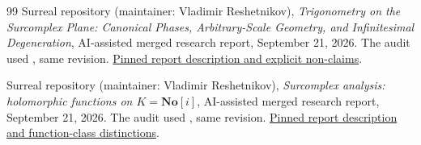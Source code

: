 \documentclass[11pt,letterpaper]{article}
\numberwithin{equation}{section}
\theoremstyle{definition}
\theoremstyle{remark}
\newcommand{\No}{\mathbf{No}}
\begin{document}
\begin{thebibliography}{99}
Surreal repository (maintainer: Vladimir Reshetnikov),
\emph{Trigonometry on the Surcomplex Plane:
Canonical Phases, Arbitrary-Scale Geometry, and Infinitesimal Degeneration},
AI-assisted merged research report, September 21, 2026.
The audit used , same revision.
\href{https://github.com/VladimirReshetnikov/Surreal/blob/e260237db9b71da8b74a0c13c8e6355119091100/docs/surcomplex/trigonometry/README.md}
{Pinned report description and explicit non-claims}.

Surreal repository (maintainer: Vladimir Reshetnikov),
\emph{Surcomplex analysis: holomorphic functions on
$K=\No[i]$}, AI-assisted merged research report, September 21, 2026.
The audit used , same revision.
\href{https://github.com/VladimirReshetnikov/Surreal/blob/e260237db9b71da8b74a0c13c8e6355119091100/docs/surcomplex/analysis/README.md}
{Pinned report description and function-class distinctions}.

\end{thebibliography}
\end{document}
